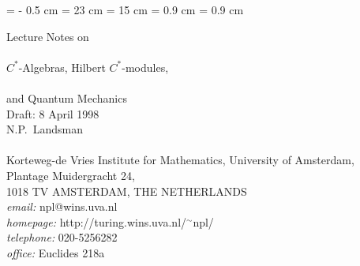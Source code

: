 \newcommand{\bofp}{{\bf p}} 
\newcommand{\bfp}{{\bf p}} 
\newcommand{\bfe}{{\bf e}} 
\newcommand{\bfu}{{\bf u}} 
\newcommand{\bg}{{\bf g}} 
\newcommand{\bR}{{\bf R}}
\newcommand{\bA}{{\bf A}} 
\newcommand{\bF}{{\bf F}}
\makeatletter
\newskip\tempskip
\def\endproof{{\parfillskip24\p@ plus\@ne fil\@@par}\tempskip\prevdepth
  \ifdim\lastskip=\z@\tempskip\z@\else\vskip-\lastskip
    \ifdim\tempskip>4\p@ \tempskip.5\tempskip \else \tempskip\z@\fi\fi
  \nobreak\vskip-\baselineskip\vskip-\tempskip\noindent\hbox 
to\hsize{\hfill
    $\blacksquare$}\par\vskip\tempskip\vskip\abovedisplayskip\@doendpe}
\makeatother
\makeatletter
\newskip\tempskip
\def\endiproof{{\parfillskip24\p@ plus\@ne fil\@@par}\tempskip\prevdepth
  \ifdim\lastskip=\z@\tempskip\z@\else\vskip-\lastskip
    \ifdim\tempskip>4\p@ \tempskip.5\tempskip \else \tempskip\z@\fi\fi
  \nobreak\vskip-\baselineskip\vskip-\tempskip\noindent\hbox 
to\hsize{\hfill
    $\Box$}\par\vskip\tempskip\vskip\abovedisplayskip\@doendpe}
\makeatother
\newcommand{\enp}{\endproof}
\newcommand{\eip}{\endiproof}
\topmargin = - 0.5 cm \textheight = 23 cm \textwidth = 15 cm
\oddsidemargin = 0.9 cm \evensidemargin = 0.9 cm
 
 \setlength{\unitlength}{1cm}
\thispagestyle{empty}
\begin{center}
{\huge Lecture Notes on \\ \mbox{}\hfill \\
$C^*$-Algebras, Hilbert $C^*$-modules, \\ \mbox{}\hfill \\
and Quantum Mechanics}
\vspace{1cm}\\Draft: 8 April 1998 \vspace{2cm}\\
{\Large  N.P.~Landsman}
    \\ \mbox{} \hfill \\
 Korteweg-de Vries Institute for Mathematics, University of Amsterdam,\\
 Plantage Muidergracht 24,\\
1018 TV AMSTERDAM, THE NETHERLANDS \vspace{6mm} \\
{\em email:} npl@wins.uva.nl\\
{\em homepage:} http://turing.wins.uva.nl/$\mbox{}^{\sim}$npl/ \\
{\em telephone:} 020-5256282\\
{\em office:} Euclides 218a\vspace{1cm}
\end{center}
\newpage
\cleardoublepage
\tableofcontents
\cleardoublepage
